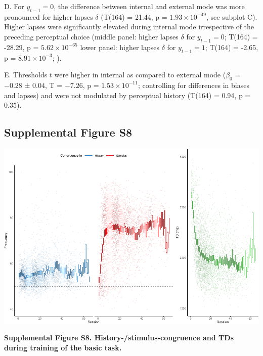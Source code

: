 \documentclass[
]{article}
\begin{document}
D. For \(y_{t-1} = 0\), the difference between internal and external
mode was more pronounced for higher lapses \(\delta\) (T(164) = 21.44, p
= \(\ensuremath{1.93\times 10^{-49}}\), see subplot C). Higher lapses
were significantly elevated during internal mode irrespective of the
preceding perceptual choice (middle panel: higher lapses \(\delta\) for
\(y_{t-1} = 0\); T(164) = -28.29, p =
\(\ensuremath{5.62\times 10^{-65}}\) lower panel: higher lapses
\(\delta\) for \(y_{t-1} = 1\); T(164) = -2.65, p =
\(\ensuremath{8.91\times 10^{-3}}\); ).

E. Thresholds \(t\) were higher in internal as compared to external mode
(\(\beta_0\) = \(-0.28\) ± \(0.04\), T = \(-7.26\), p =
\(\ensuremath{1.53\times 10^{-11}}\); controlling for differences in
biases and lapses) and were not modulated by perceptual history (T(164)
= 0.94, p = \(0.35\)).

\newpage

\hypertarget{supplemental-figure-s8}{%
\subsection{Supplemental Figure S8}\label{supplemental-figure-s8}}

\includegraphics{modes_mouse_rev1b_clean_files/figure-latex/Supplemental_Figure_S8-1.pdf}

\textbf{Supplemental Figure S8. History-/stimulus-congruence and TDs
during training of the basic task.}
\end{document}
